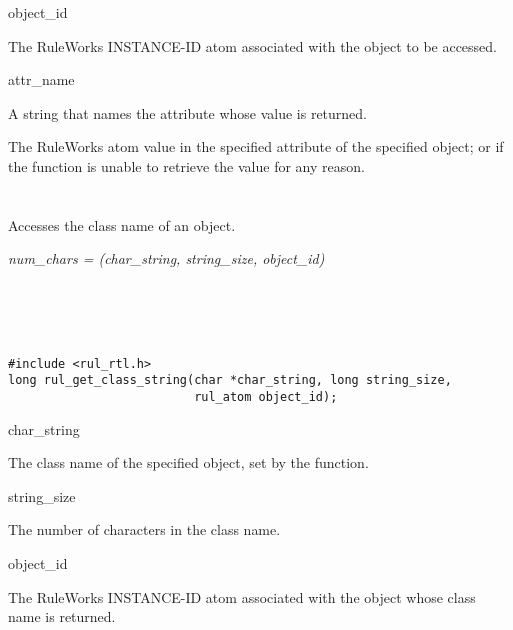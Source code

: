 \begin{arguments}
\item[object\_id]

  The RuleWorks INSTANCE-ID atom associated with the object to be
  accessed.

\item[attr\_name]

  A string that names the attribute whose value is returned.
\end{arguments}

\ReturnValue

The RuleWorks atom value in the specified attribute of the specified
object; or  if the function is unable to
retrieve the value for any reason.

\begin{seealso}
\end{seealso}

\section*{}

Accesses the class name of an object.

\Syntax

\it{num\_chars} = (\it{char\_string},
\it{string\_size}, \it{object\_id})

\begin{args}
   \\
   \\
   \\
\end{args}

\CBinding
\begin{verbatim}
#include <rul_rtl.h>
long rul_get_class_string(char *char_string, long string_size,
                          rul_atom object_id);
\end{verbatim}

\begin{arguments}
\item[char\_string]

  The class name of the specified object, set by the function.

\item[string\_size]

  The number of characters in the class name.

\item[object\_id]

  The RuleWorks INSTANCE-ID atom associated with the object whose
  class name is returned.
\end{arguments}

